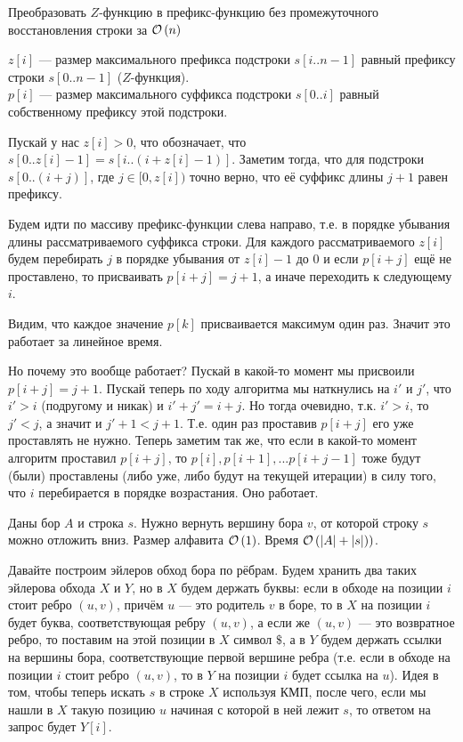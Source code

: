 \begin{task}[3]
Преобразовать $Z$-функцию в префикс-функцию без промежуточного восстановления строки за $\mathcal{O}\left(n\right)$
\end{task}
\begin{solution}
$z[i]$ --- размер максимального префикса подстроки $s[i..n-1]$ равный префиксу строки $s[0..n-1]$ ($Z$-функция).\\
$p[i]$ --- размер максимального суффикса подстроки $s[0..i]$ равный собственному префиксу этой подстроки.

Пускай у нас $z[i] > 0$, что обозначает, что $s[0..z[i]-1] = s[i..(i + z[i] - 1)]$. Заметим тогда, что для подстроки $s[0..(i + j)]$, где $j \in [0, z[i])$ точно верно, что её суффикс длины $j + 1$ равен префиксу.

Будем идти по массиву префикс-функции слева направо, т.е. в порядке убывания длины рассматриваемого суффикса строки. Для каждого рассматриваемого $z[i]$ будем перебирать $j$ в порядке убывания от $z[i] - 1$ до $0$ и если 
$p[i + j]$ ещё не проставлено, то присваивать $p[i + j] = j + 1$, а иначе переходить к следующему $i$.

Видим, что каждое значение $p[k]$ присваивается максимум один раз. Значит это работает за линейное время.

Но почему это вообще работает? Пускай в какой-то момент мы присвоили $p[i + j] = j + 1$. Пускай теперь по ходу алгоритма мы наткнулись на $i'$ и $j'$, что $i' > i$ (подругому и никак) и $i' + j' = i + j$. Но тогда очевидно, т.к. $i' > i$, то $j' < j$, а значит и $j' + 1 < j + 1$. Т.е. один раз проставив $p[i + j]$ его уже проставлять не нужно. Теперь заметим так же, что если в какой-то момент алгоритм проставил $p[i+j]$, то $p[i], p[i + 1],...p[i+j-1]$ тоже будут (были) проставлены (либо уже, либо будут на текущей итерации) в силу того, что $i$ перебирается в порядке возрастания. Оно работает. \xqed
\end{solution}


\begin{task}[5]
Даны бор $A$ и строка $s$. Нужно вернуть вершину бора $v$, от которой строку $s$ можно отложить вниз. Размер алфавита $\mathcal{O}\left(1\right)$. Время $\mathcal{O}\left(|A|+|s|)\right)$.
\end{task}
\begin{solution}
Давайте построим эйлеров обход бора по рёбрам. Будем хранить два таких эйлерова обхода $X$ и $Y$, но в $X$ будем держать буквы: если в обходе на позиции $i$ стоит ребро $(u, v)$, причём $u$ --- это родитель $v$ в боре, то в $X$ на позиции $i$ будет буква, соответствующая ребру $(u, v)$, а если же $(u, v)$ --- это возвратное ребро, то поставим на этой позиции в $X$ символ $\$$, а в $Y$ будем держать ссылки на вершины бора, соответствующие первой вершине ребра (т.е. если в обходе на позиции $i$ стоит ребро $(u, v)$, то в $Y$ на позиции $i$ будет ссылка на $u$). Идея в том, чтобы теперь искать $s$ в строке $X$ используя КМП, после чего, если мы нашли в $X$ такую позицию $u$ начиная с которой в ней лежит $s$, то ответом на запрос будет $Y[i]$. \xqed
\end{solution}

